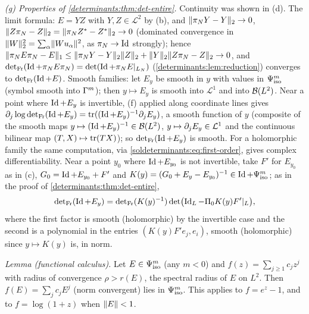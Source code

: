 \emph{(g) Properties of \cref{determinants:thm:det-entire}.} Continuity was shown in (d). The limit
formula: $E=YZ$ with $Y,Z\in\mathcal L^2$ by (b), and $\lVert \pi_NY-Y\rVert_2\to0$,
$\lVert Z\pi_N-Z\rVert_2=\lVert \pi_NZ^*-Z^*\rVert_2\to0$ (dominated convergence in
$\lVert W\rVert_2^2=\sum_\alpha\lVert Wu_\alpha\rVert^2$, as $\pi_N\to\operatorname{Id}$ strongly); hence
$\lVert \pi_NE\pi_N-E\rVert_1\le\lVert \pi_NY-Y\rVert_2\lVert Z\rVert_2+\lVert Y\rVert_2\lVert Z\pi_N-Z\rVert_2\to0$, and
$\operatorname{det}_{\mathrm{Fr}}(\operatorname{Id}+\pi_NE\pi_N)=\det(\operatorname{Id}+\pi_NE|_{L_N})$ (\cref{determinants:lem:reduction}) converges to
$\operatorname{det}_{\mathrm{Fr}}(\operatorname{Id}+E)$. Smooth families: let $E_y$ be smooth in $y$ with values in $\Psi^{m}_{\mathrm{iso}}$ (symbol smooth
into $\Gamma^{m}$); then $y\mapsto E_y$ is smooth into $\mathcal L^1$ and into $\mathcal{B}(L^2)$. Near a point where
$\operatorname{Id}+E_y$ is invertible, (f) applied along coordinate lines gives
$\partial_j\log\operatorname{det}_{\mathrm{Fr}}(\operatorname{Id}+E_y)=\operatorname{tr}((\operatorname{Id}+E_y)^{-1}\partial_jE_y)$, a smooth function of $y$ (composite of the smooth
maps $y\mapsto(\operatorname{Id}+E_y)^{-1}\in\mathcal{B}(L^2)$, $y\mapsto\partial_jE_y\in\mathcal L^1$ and the continuous bilinear
map $(T,X)\mapsto\operatorname{tr}(TX)$); so $\operatorname{det}_{\mathrm{Fr}}(\operatorname{Id}+E_y)$ is smooth. For a holomorphic family the same
computation, via \eqref{soldeterminants:eq:first-order}, gives complex differentiability. Near a point $y_0$
where $\operatorname{Id}+E_{y_0}$ is not invertible, take $F'$ for $E_{y_0}$ as in (c), $G_0=\operatorname{Id}+E_{y_0}+F'$ and
$K(y)=(G_0+E_y-E_{y_0})^{-1}\in\operatorname{Id}+\Psi^{m}_{\mathrm{iso}}$; as in the proof of \cref{determinants:thm:det-entire},
\begin{equation*}
  \operatorname{det}_{\mathrm{Fr}}(\operatorname{Id}+E_y)=\operatorname{det}_{\mathrm{Fr}}(K(y)^{-1})\det\bigl(\operatorname{Id}_L-\Pi_0K(y)F'|_L\bigr),
\end{equation*}
where the first factor is smooth (holomorphic) by the invertible case and the second is a polynomial
in the entries $(K(y)F'e_j,e_i)$, smooth (holomorphic) since $y\mapsto K(y)$ is, in norm.

\emph{Lemma (functional calculus).} Let $E\in\Psi^{m}_{\mathrm{iso}}$ (any $m<0$) and $f(z)=\sum_{j\ge1}c_jz^j$ with radius
of convergence $\rho>r(E)$, the spectral radius of $E$ on $L^2$. Then $f(E)=\sum_jc_jE^j$ (norm
convergent) lies in $\Psi^{m}_{\mathrm{iso}}$. This applies to $f=e^z-1$, and to $f=\log(1+z)$ when $\lVert E\rVert<1$.

